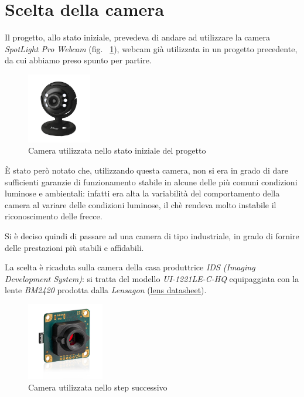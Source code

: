 \section{Scelta della camera}
Il progetto, allo stato iniziale, prevedeva di andare ad utilizzare la camera \textit{SpotLight Pro Webcam} (fig. ~\ref{fig:TrustCam}), webcam già utilizzata in un progetto precedente, da cui abbiamo preso spunto per partire.
\begin{figure}[H]
	\centering
	\includegraphics[width=0.25\textwidth]{Immagini/TrustCam.jpg}
	\caption{Camera utilizzata nello stato iniziale del progetto}
	\label{fig:TrustCam}
\end{figure}

È stato però notato che, utilizzando questa camera, non si era in grado di dare sufficienti garanzie di funzionamento stabile in alcune delle più comuni condizioni luminose e ambientali: infatti era alta la variabilità del comportamento della camera al variare delle condizioni luminose, il chè rendeva molto instabile il riconoscimento delle frecce.

Si è deciso quindi di passare ad una camera di tipo industriale, in grado di fornire delle prestazioni più stabili e affidabili.

La scelta è ricaduta sulla camera della casa produttrice \textit{IDS (Imaging Development System)}: si tratta del modello \textit{UI-1221LE-C-HQ} equipaggiata con la lente \textit{BM2420} prodotta dalla \textit{Lensagon} (\href{https://www.lensation.de/product/BM2420/}{lens datasheet}).
\begin{figure}[H]
	\centering
	\includegraphics[width=0.3\textwidth]{Immagini/camera-usb2-ueye-le-rev2-boardlevel-m12-1.jpg}
	\caption{Camera utilizzata nello step successivo}
	\label{fig:UeyeCam}
\end{figure}

